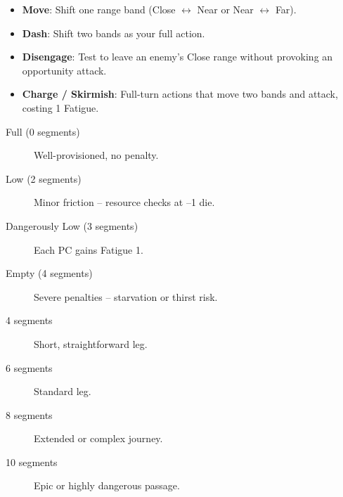 \begin{tcolorbox}[title=Movement Actions, colback=white!97!gray, colframe=black!80!gray,breakable]
\begin{itemize}
  \item \textbf{Move}: Shift one range band (Close \(\leftrightarrow\) Near or Near \(\leftrightarrow\) Far).
  \item \textbf{Dash}: Shift two bands as your full action.
  \item \textbf{Disengage}: Test to leave an enemy's Close range without provoking an opportunity attack.
  \item \textbf{Charge / Skirmish}: Full-turn actions that move two bands and attack, costing 1 Fatigue.
\end{itemize}
\end{tcolorbox}

\begin{tcolorbox}[title=Supply Timer States, colback=white!97!gray, colframe=black!80!gray,breakable]
\begin{description}
\item[Full (0 segments)] Well-provisioned, no penalty.
\item[Low (2 segments)] Minor friction -- resource checks at --1 die.
\item[Dangerously Low (3 segments)] Each PC gains Fatigue 1.
\item[Empty (4 segments)] Severe penalties -- starvation or thirst risk.
\end{description}
\end{tcolorbox}

\begin{tcolorbox}[title=Travel Timer Sizes, colback=white!97!gray, colframe=black!80!gray,breakable]
\begin{description}
\item[4 segments] Short, straightforward leg.
\item[6 segments] Standard leg.
\item[8 segments] Extended or complex journey.
\item[10 segments] Epic or highly dangerous passage.
\end{description}
\end{tcolorbox}

